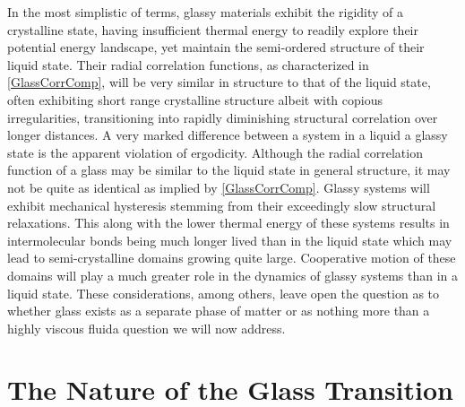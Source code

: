 In the most simplistic of terms, glassy materials exhibit the rigidity of a crystalline state, having insufficient thermal energy to readily explore their potential energy landscape, yet maintain the semi-ordered structure of their liquid state.  Their radial correlation functions, as characterized in \fig \nolinebreak \ref{GlassCorrComp}, will be very similar in structure to that of the liquid state, often exhibiting short range crystalline structure albeit with copious irregularities, transitioning into rapidly diminishing structural correlation over longer distances.  A very marked difference between a system in a liquid \vs a glassy state is the apparent violation of ergodicity.  Although the radial correlation function of a glass may be similar to the liquid state in general structure, it may not be quite as identical as implied by \fig \nolinebreak \ref{GlassCorrComp}.  Glassy systems will exhibit mechanical hysteresis stemming from their exceedingly slow structural relaxations. This along with the lower thermal energy of these systems results in intermolecular bonds being much longer lived than in the liquid state which may lead to semi-crystalline domains growing quite large.  Cooperative motion of these domains will play a much greater role in the dynamics of glassy systems than in a liquid state.  These considerations, among others, leave open the question as to whether glass exists as a separate phase of matter or as nothing more than a highly viscous fluid\textemdash a question we will now address.  

\section{The Nature of the Glass Transition}

